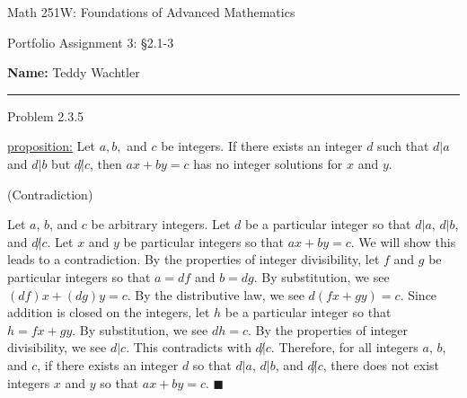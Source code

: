 \documentclass{article}
\theoremstyle{definition}
\begin{document}
	\begin{center}
		\Large{Math 251W: Foundations of Advanced Mathematics}

		\normalsize{Portfolio Assignment 3: \S 2.1-3}

		\vspace{0.2cm}

		\hfill {\bf Name:} Teddy Wachtler

		\vspace{0.25cm}
		\hrule
	\end{center}

	\vspace{0.3cm}


	\noindent Problem 2.3.5
	\vspace{0.3cm}

	\underline{proposition:} Let $a, b,$ and $c$ be integers.
	If there exists an integer $d$ such that $d|a$ and $d|b$ but $d\not|c$, then $ax+by=c$ has no integer solutions for $x$ and $y$.
	\vspace{0.4cm}

	 (Contradiction)
	\vspace{0.2cm}

	Let $a$, $b$, and $c$ be arbitrary integers.
	Let $d$ be a particular integer so that $d|a$, $d|b$, and $d\not | c$.
	Let $x$ and $y$ be particular integers so that $ax + by = c$.
	We will show this leads to a contradiction.
	By the properties of integer divisibility, let $f$ and $g$ be particular integers so that $a = df$ and $b = dg$.
	By substitution, we see $(df)x + (dg)y = c$.
	By the distributive law, we see $d(fx + gy) = c$.
	Since addition is closed on the integers, let $h$ be a particular integer so that $h = fx + gy$.
	By substitution, we see $dh = c$.
	By the properties of integer divisibility, we see $d | c$.
	This contradicts with $d \not | c$.
	Therefore, for all integers $a$, $b$, and $c$, if there exists an integer $d$ so that $d|a$, $d|b$, and $d\not | c$, there does not exist integers $x$ and $y$ so that $ax + by = c$.
	$\blacksquare$

	\vspace{1cm}
\end{document}
